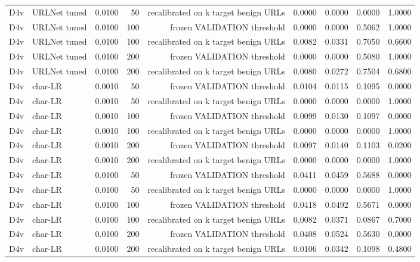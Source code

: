 \begin{table}[t]
\begin{tabular}{llrrrrrrr}
D4v & URLNet tuned & 0.0100 & 50 & recalibrated on k target benign URLs & 0.0000 & 0.0000 & 0.0000 & 1.0000 \\
D4v & URLNet tuned & 0.0100 & 100 & frozen VALIDATION threshold & 0.0000 & 0.0000 & 0.5062 & 1.0000 \\
D4v & URLNet tuned & 0.0100 & 100 & recalibrated on k target benign URLs & 0.0082 & 0.0331 & 0.7050 & 0.6600 \\
D4v & URLNet tuned & 0.0100 & 200 & frozen VALIDATION threshold & 0.0000 & 0.0000 & 0.5080 & 1.0000 \\
D4v & URLNet tuned & 0.0100 & 200 & recalibrated on k target benign URLs & 0.0080 & 0.0272 & 0.7504 & 0.6800 \\
D4v & char-LR & 0.0010 & 50 & frozen VALIDATION threshold & 0.0104 & 0.0115 & 0.1095 & 0.0000 \\
D4v & char-LR & 0.0010 & 50 & recalibrated on k target benign URLs & 0.0000 & 0.0000 & 0.0000 & 1.0000 \\
D4v & char-LR & 0.0010 & 100 & frozen VALIDATION threshold & 0.0099 & 0.0130 & 0.1097 & 0.0000 \\
D4v & char-LR & 0.0010 & 100 & recalibrated on k target benign URLs & 0.0000 & 0.0000 & 0.0000 & 1.0000 \\
D4v & char-LR & 0.0010 & 200 & frozen VALIDATION threshold & 0.0097 & 0.0140 & 0.1103 & 0.0200 \\
D4v & char-LR & 0.0010 & 200 & recalibrated on k target benign URLs & 0.0000 & 0.0000 & 0.0000 & 1.0000 \\
D4v & char-LR & 0.0100 & 50 & frozen VALIDATION threshold & 0.0411 & 0.0459 & 0.5688 & 0.0000 \\
D4v & char-LR & 0.0100 & 50 & recalibrated on k target benign URLs & 0.0000 & 0.0000 & 0.0000 & 1.0000 \\
D4v & char-LR & 0.0100 & 100 & frozen VALIDATION threshold & 0.0418 & 0.0492 & 0.5671 & 0.0000 \\
D4v & char-LR & 0.0100 & 100 & recalibrated on k target benign URLs & 0.0082 & 0.0371 & 0.0867 & 0.7000 \\
D4v & char-LR & 0.0100 & 200 & frozen VALIDATION threshold & 0.0408 & 0.0524 & 0.5630 & 0.0000 \\
D4v & char-LR & 0.0100 & 200 & recalibrated on k target benign URLs & 0.0106 & 0.0342 & 0.1098 & 0.4800 \\
\bottomrule
\end{tabular}
\end{table}